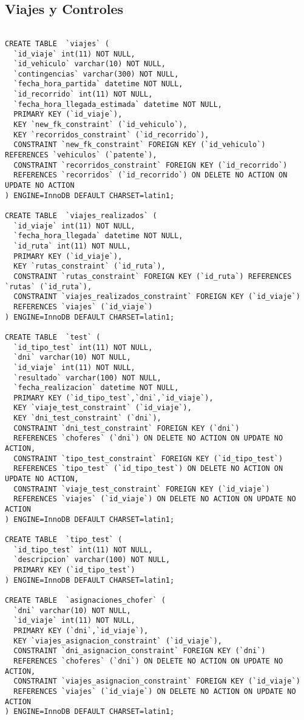 \subsection{Viajes y Controles}

\begin{verbatim}

CREATE TABLE  `viajes` (
  `id_viaje` int(11) NOT NULL,
  `id_vehiculo` varchar(10) NOT NULL,
  `contingencias` varchar(300) NOT NULL,
  `fecha_hora_partida` datetime NOT NULL,
  `id_recorrido` int(11) NOT NULL,
  `fecha_hora_llegada_estimada` datetime NOT NULL,
  PRIMARY KEY (`id_viaje`),
  KEY `new_fk_constraint` (`id_vehiculo`),
  KEY `recorridos_constraint` (`id_recorrido`),
  CONSTRAINT `new_fk_constraint` FOREIGN KEY (`id_vehiculo`) REFERENCES `vehiculos` (`patente`),
  CONSTRAINT `recorridos_constraint` FOREIGN KEY (`id_recorrido`) 
  REFERENCES `recorridos` (`id_recorrido`) ON DELETE NO ACTION ON UPDATE NO ACTION
) ENGINE=InnoDB DEFAULT CHARSET=latin1;

CREATE TABLE  `viajes_realizados` (
  `id_viaje` int(11) NOT NULL,
  `fecha_hora_llegada` datetime NOT NULL,
  `id_ruta` int(11) NOT NULL,
  PRIMARY KEY (`id_viaje`),
  KEY `rutas_constraint` (`id_ruta`),
  CONSTRAINT `rutas_constraint` FOREIGN KEY (`id_ruta`) REFERENCES `rutas` (`id_ruta`),
  CONSTRAINT `viajes_realizados_constraint` FOREIGN KEY (`id_viaje`) 
  REFERENCES `viajes` (`id_viaje`)
) ENGINE=InnoDB DEFAULT CHARSET=latin1;

CREATE TABLE  `test` (
  `id_tipo_test` int(11) NOT NULL,
  `dni` varchar(10) NOT NULL,
  `id_viaje` int(11) NOT NULL,
  `resultado` varchar(100) NOT NULL,
  `fecha_realizacion` datetime NOT NULL,
  PRIMARY KEY (`id_tipo_test`,`dni`,`id_viaje`),
  KEY `viaje_test_constraint` (`id_viaje`),
  KEY `dni_test_constraint` (`dni`),
  CONSTRAINT `dni_test_constraint` FOREIGN KEY (`dni`) 
  REFERENCES `choferes` (`dni`) ON DELETE NO ACTION ON UPDATE NO ACTION,
  CONSTRAINT `tipo_test_constraint` FOREIGN KEY (`id_tipo_test`) 
  REFERENCES `tipo_test` (`id_tipo_test`) ON DELETE NO ACTION ON UPDATE NO ACTION,
  CONSTRAINT `viaje_test_constraint` FOREIGN KEY (`id_viaje`) 
  REFERENCES `viajes` (`id_viaje`) ON DELETE NO ACTION ON UPDATE NO ACTION
) ENGINE=InnoDB DEFAULT CHARSET=latin1;

CREATE TABLE  `tipo_test` (
  `id_tipo_test` int(11) NOT NULL,
  `descripcion` varchar(100) NOT NULL,
  PRIMARY KEY (`id_tipo_test`)
) ENGINE=InnoDB DEFAULT CHARSET=latin1;

CREATE TABLE  `asignaciones_chofer` (
  `dni` varchar(10) NOT NULL,
  `id_viaje` int(11) NOT NULL,
  PRIMARY KEY (`dni`,`id_viaje`),
  KEY `viajes_asignacion_constraint` (`id_viaje`),
  CONSTRAINT `dni_asignacion_constraint` FOREIGN KEY (`dni`) 
  REFERENCES `choferes` (`dni`) ON DELETE NO ACTION ON UPDATE NO ACTION,
  CONSTRAINT `viajes_asignacion_constraint` FOREIGN KEY (`id_viaje`) 
  REFERENCES `viajes` (`id_viaje`) ON DELETE NO ACTION ON UPDATE NO ACTION
) ENGINE=InnoDB DEFAULT CHARSET=latin1;

\end{verbatim}

